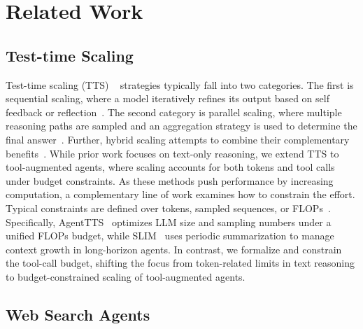 \section{Related Work}


\subsection{Test-time Scaling}
Test-time scaling (TTS) ~\citep{DBLP:journals/corr/abs-2408-03314, DBLP:journals/corr/abs-2503-24235} strategies typically fall into two categories.
The first is sequential scaling, where a model iteratively refines its output based on self feedback or reflection~\citep{DBLP:conf/nips/MadaanTGHGW0DPY23, DBLP:journals/tmlr/ZhangYYY25,DBLP:journals/corr/abs-2501-19393, DBLP:journals/corr/abs-2507-14295}. The second category is parallel scaling, where multiple reasoning paths are sampled and an aggregation strategy is used to determine the final answer~\citep{DBLP:journals/corr/abs-2407-21787,DBLP:conf/iclr/0002WSLCNCZ23}. Further, hybrid scaling attempts to combine their complementary benefits~\citep{DBLP:journals/corr/abs-2504-00762,DBLP:journals/corr/abs-2501-19306,DBLP:conf/naacl/WanWCL25,DBLP:conf/iclr/LiYFPW0W024}.
While prior work focuses on text-only reasoning, we extend TTS to tool-augmented agents, where scaling accounts for both tokens and tool calls under budget constraints.
As these methods push performance by increasing computation, a complementary line of work examines how to constrain the effort. Typical constraints are defined over tokens, sampled sequences, or FLOPs~\citep{DBLP:journals/corr/abs-2407-19825,DBLP:journals/tmlr/WelleckBFSXNKH24,DBLP:conf/iclr/DamaniSPBA25,DBLP:journals/corr/abs-2504-13367}. Specifically, AgentTTS~\citep{DBLP:journals/corr/abs-2508-00890} optimizes LLM size and sampling numbers under a unified FLOPs budget, while SLIM~\citep{DBLP:journals/corr/abs-2510-18939} uses periodic summarization to manage context growth in long-horizon agents.
In contrast, we formalize and constrain the tool-call budget, shifting the focus from token-related limits in text reasoning to budget-constrained scaling of tool-augmented agents.



\subsection{Web Search Agents}

